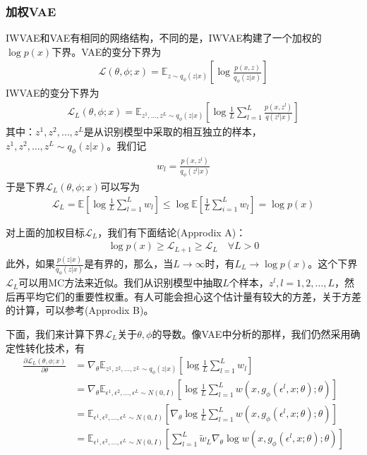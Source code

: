         \subsubsection{加权VAE}
        \par
        IWVAE和VAE有相同的网络结构，不同的是，IWVAE构建了一个加权的$\log p(x)$下界。VAE的变分下界为
        \begin{align*}
        \mathcal{L}(\theta,\phi;x) = \mathbb{E}_{z\sim q_\phi(z|x)} \left[ \log \frac{p(x,z)}{q_\phi(z|x)} \right]
        \end{align*}
        IWVAE的变分下界为
        \begin{align*}
        \mathcal{L}_L(\theta,\phi;x) =\mathbb{E}_{z^1,\dots,z^L \sim q_\phi(z|x)} \left[ \log \frac 1 L \sum_{l=1}^L \frac{p(x,z^l)}{q(z^l|x)} \right]
        \end{align*}
        其中：$z^1,z^2,\dots,z^L$是从识别模型中采取的相互独立的样本，$z^1,z^2,\dots,z^L\sim q_\phi(z|x)$。我们记
        \begin{align*}
        w_l = \frac{p(x,z^l)}{q_\phi(z^l|x)}
        \end{align*}
        于是下界$\mathcal{L}_L(\theta,\phi;x)$可以写为
        \begin{align*}
        \mathcal{L}_L = \mathbb{E} \left[\log \frac{1}{L} \sum_{l=1}^L w_l \right] \leqslant \log \mathbb{E}\left[ \frac{1}{L}\sum_{i=1}^Lw_l \right] = \log p(x)
        \end{align*}
        \par
        对上面的加权目标$\mathcal{L}_L$，我们有下面结论\cite{2016.Burda}(Approdix A)：
        \begin{align*}
        \log p(x) \geqslant \mathcal{L}_{L+1} \geqslant \mathcal{L}_L \quad \forall L>0
        \end{align*}
        此外，如果$\frac{p(z|x)}{q_\phi(z|x)}$是有界的，那么，当$L\rightarrow \infty$时，有$L_L \rightarrow \log p(x)$。这个下界$\mathcal{L}_L$可以用MC方法来近似。我们从识别模型中抽取$L$个样本，$z^l,l=1,2,\dots,L$，然后再平均它们的重要性权重。有人可能会担心这个估计量有较大的方差，关于方差的计算，可以参考\cite{2016.Burda}(Approdix B)。
        \par
        下面，我们来计算下界$\mathcal{L}_L$关于$\theta,\phi$的导数。像VAE中分析的那样，我们仍然采用确定性转化技术，有
        \begin{align*}
        \frac{\partial \mathcal{L}_L(\theta,\phi;x)}{\partial \theta} & = \nabla_\theta \mathbb{E}_{z^1,z^2,\dots,z^L\sim q_\phi(z|x)} \left[ \log \frac{1}{L}\sum_{l=1}^Lw_l \right]\\
        & =\nabla_\theta \mathbb{E}_{\epsilon^1,\epsilon^2,\dots,\epsilon^L\sim N(0,I)} \left[ \log\frac{1}{L}\sum_{l=1}^L w \left( x,g_\phi(\epsilon^l,x;\theta);\theta \right)  \right]\\
        & =\mathbb{E}_{\epsilon^1,\epsilon^2,\dots,\epsilon^L\sim N(0,I)}  \left[\nabla_\theta  \log\frac{1}{L}\sum_{l=1}^L w \left( x,g_\phi(\epsilon^l,x;\theta);\theta \right)  \right]\\
       &  =\mathbb{E}_{\epsilon^1,\epsilon^2,\dots,\epsilon^L\sim N(0,I)}  \left[ \sum_{l=1}^L \tilde{w}_L\nabla_\theta\log w \left( x,g_\phi(\epsilon^l,x;\theta);\theta \right)  \right]
        \end{align*}
